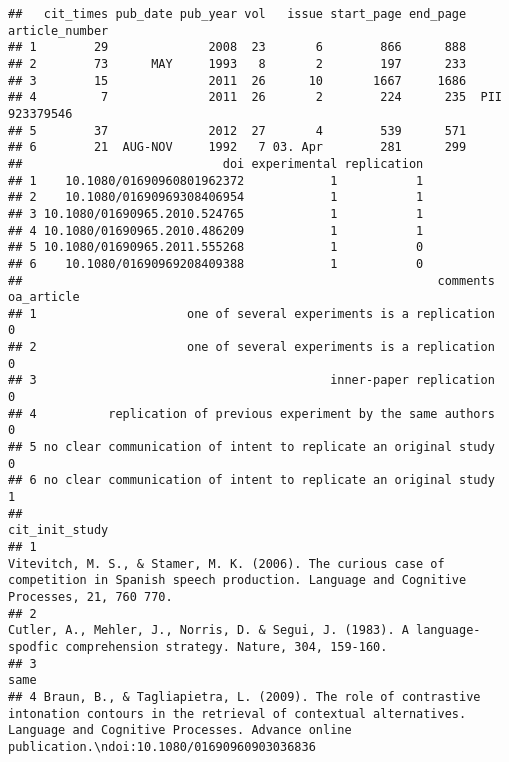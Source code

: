 \documentclass[
  english,
  man]{apa6}
\begin{document}
\begin{verbatim}
##   cit_times pub_date pub_year vol   issue start_page end_page article_number
## 1        29              2008  23       6        866      888               
## 2        73      MAY     1993   8       2        197      233               
## 3        15              2011  26      10       1667     1686               
## 4         7              2011  26       2        224      235  PII 923379546
## 5        37              2012  27       4        539      571               
## 6        21  AUG-NOV     1992   7 03. Apr        281      299               
##                            doi experimental replication
## 1    10.1080/01690960801962372            1           1
## 2    10.1080/01690969308406954            1           1
## 3 10.1080/01690965.2010.524765            1           1
## 4 10.1080/01690965.2010.486209            1           1
## 5 10.1080/01690965.2011.555268            1           0
## 6    10.1080/01690969208409388            1           0
##                                                          comments oa_article
## 1                     one of several experiments is a replication          0
## 2                     one of several experiments is a replication          0
## 3                                         inner-paper replication          0
## 4          replication of previous experiment by the same authors          0
## 5 no clear communication of intent to replicate an original study          0
## 6 no clear communication of intent to replicate an original study          1
##                                                                                                                                                                                                                cit_init_study
## 1                                                                      Vitevitch, M. S., & Stamer, M. K. (2006). The curious case of competition in Spanish speech production. Language and Cognitive Processes, 21, 760 770.
## 2                                                                                                     Cutler, A., Mehler, J., Norris, D. & Segui, J. (1983). A language-spodfic comprehension strategy. Nature, 304, 159-160.
## 3                                                                                                                                                                                                                        same
## 4 Braun, B., & Tagliapietra, L. (2009). The role of contrastive intonation contours in the retrieval of contextual alternatives. Language and Cognitive Processes. Advance online publication.\ndoi:10.1080/01690960903036836

\end{verbatim}
\end{document}
